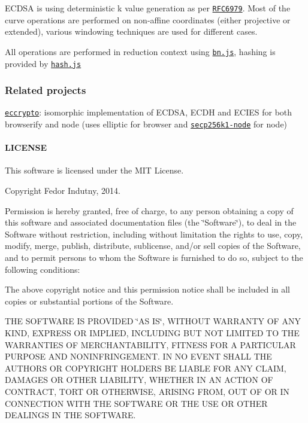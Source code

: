 E\+C\+D\+SA is using deterministic {\ttfamily k} value generation as per \href{http://tools.ietf.org/html/rfc6979}{\tt R\+F\+C6979}. Most of the curve operations are performed on non-\/affine coordinates (either projective or extended), various windowing techniques are used for different cases.

All operations are performed in reduction context using \href{https://github.com/indutny/bn.js}{\tt bn.\+js}, hashing is provided by \href{https://github.com/indutny/hash.js}{\tt hash.\+js}

\subsubsection*{Related projects}


\begin{DoxyItemize}
\item \href{https://github.com/bitchan/eccrypto}{\tt eccrypto}\+: isomorphic implementation of E\+C\+D\+SA, E\+C\+DH and E\+C\+I\+ES for both browserify and node (uses {\ttfamily elliptic} for browser and \href{https://github.com/wanderer/secp256k1-node}{\tt secp256k1-\/node} for node)
\end{DoxyItemize}

\paragraph*{L\+I\+C\+E\+N\+SE}

This software is licensed under the M\+IT License.

Copyright Fedor Indutny, 2014.

Permission is hereby granted, free of charge, to any person obtaining a copy of this software and associated documentation files (the \char`\"{}\+Software\char`\"{}), to deal in the Software without restriction, including without limitation the rights to use, copy, modify, merge, publish, distribute, sublicense, and/or sell copies of the Software, and to permit persons to whom the Software is furnished to do so, subject to the following conditions\+:

The above copyright notice and this permission notice shall be included in all copies or substantial portions of the Software.

T\+HE S\+O\+F\+T\+W\+A\+RE IS P\+R\+O\+V\+I\+D\+ED \char`\"{}\+A\+S I\+S\char`\"{}, W\+I\+T\+H\+O\+UT W\+A\+R\+R\+A\+N\+TY OF A\+NY K\+I\+ND, E\+X\+P\+R\+E\+SS OR I\+M\+P\+L\+I\+ED, I\+N\+C\+L\+U\+D\+I\+NG B\+UT N\+OT L\+I\+M\+I\+T\+ED TO T\+HE W\+A\+R\+R\+A\+N\+T\+I\+ES OF M\+E\+R\+C\+H\+A\+N\+T\+A\+B\+I\+L\+I\+TY, F\+I\+T\+N\+E\+SS F\+OR A P\+A\+R\+T\+I\+C\+U\+L\+AR P\+U\+R\+P\+O\+SE A\+ND N\+O\+N\+I\+N\+F\+R\+I\+N\+G\+E\+M\+E\+NT. IN NO E\+V\+E\+NT S\+H\+A\+LL T\+HE A\+U\+T\+H\+O\+RS OR C\+O\+P\+Y\+R\+I\+G\+HT H\+O\+L\+D\+E\+RS BE L\+I\+A\+B\+LE F\+OR A\+NY C\+L\+A\+IM, D\+A\+M\+A\+G\+ES OR O\+T\+H\+ER L\+I\+A\+B\+I\+L\+I\+TY, W\+H\+E\+T\+H\+ER IN AN A\+C\+T\+I\+ON OF C\+O\+N\+T\+R\+A\+CT, T\+O\+RT OR O\+T\+H\+E\+R\+W\+I\+SE, A\+R\+I\+S\+I\+NG F\+R\+OM, O\+UT OF OR IN C\+O\+N\+N\+E\+C\+T\+I\+ON W\+I\+TH T\+HE S\+O\+F\+T\+W\+A\+RE OR T\+HE U\+SE OR O\+T\+H\+ER D\+E\+A\+L\+I\+N\+GS IN T\+HE S\+O\+F\+T\+W\+A\+RE. 